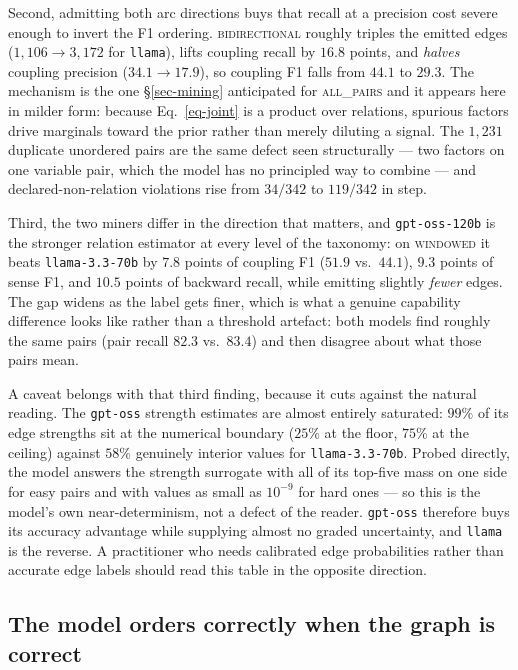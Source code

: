 Second, admitting both arc directions buys that recall at a precision cost severe enough to invert the
F1 ordering. \textsc{bidirectional} roughly triples the emitted edges ($1{,}106 \to 3{,}172$ for
\texttt{llama}), lifts coupling recall by $16.8$ points, and \emph{halves} coupling precision
($34.1 \to 17.9$), so coupling F1 falls from $44.1$ to $29.3$. The mechanism is the one
\S\ref{sec-mining} anticipated for \textsc{all\_pairs} and it appears here in milder form: because
Eq.~\ref{eq-joint} is a product over relations, spurious factors drive marginals toward the prior
rather than merely diluting a signal. The $1{,}231$ duplicate unordered pairs are the same defect
seen structurally --- two factors on one variable pair, which the model has no principled way to
combine --- and declared-non-relation violations rise from $34/342$ to $119/342$ in step.

Third, the two miners differ in the direction that matters, and \texttt{gpt-oss-120b} is the stronger
relation estimator at every level of the taxonomy: on \textsc{windowed} it beats \texttt{llama-3.3-70b}
by $7.8$ points of coupling F1 ($51.9$ vs.\ $44.1$), $9.3$ points of sense F1, and $10.5$ points of
backward recall, while emitting slightly \emph{fewer} edges. The gap widens as the label gets finer,
which is what a genuine capability difference looks like rather than a threshold artefact: both
models find roughly the same pairs (pair recall $82.3$ vs.\ $83.4$) and then disagree about what
those pairs mean.

A caveat belongs with that third finding, because it cuts against the natural reading. The
\texttt{gpt-oss} strength estimates are almost entirely saturated: $99\%$ of its edge strengths sit at
the numerical boundary ($25\%$ at the floor, $75\%$ at the ceiling) against $58\%$ genuinely interior
values for \texttt{llama-3.3-70b}. Probed directly, the model answers the strength surrogate with all
of its top-five mass on one side for easy pairs and with values as small as $10^{-9}$ for hard ones ---
so this is the model's own near-determinism, not a defect of the reader. \texttt{gpt-oss} therefore
buys its accuracy advantage while supplying almost no graded uncertainty, and \texttt{llama} is the
reverse. A practitioner who needs calibrated edge probabilities rather than accurate edge labels
should read this table in the opposite direction.

\subsection{The model orders correctly when the graph is correct}

